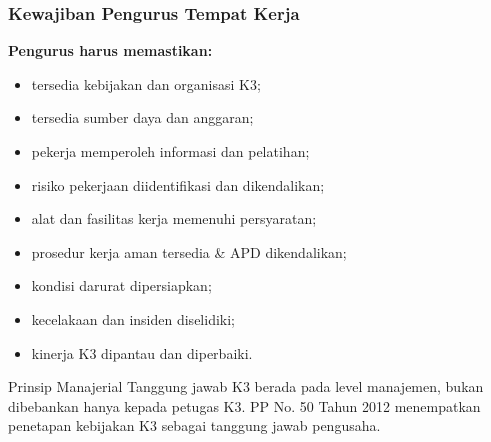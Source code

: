 \documentclass[../main.tex]{subfiles}
\begin{document}
\begin{frame}[mytitle=standard,t,mycolor=digiPH_cream!30]
	\frametitle{Kewajiban Pengurus Tempat Kerja}

	\textbf{Pengurus harus memastikan:}
	\begin{itemize}
		\item tersedia kebijakan dan organisasi K3;
		\item tersedia sumber daya dan anggaran;
		\item pekerja memperoleh informasi dan pelatihan;
		\item risiko pekerjaan diidentifikasi dan dikendalikan;
		\item alat dan fasilitas kerja memenuhi persyaratan;
		\item prosedur kerja aman tersedia \& APD dikendalikan;
		\item kondisi darurat dipersiapkan;
		\item kecelakaan dan insiden diselidiki;
		\item kinerja K3 dipantau dan diperbaiki.
	\end{itemize}

	\begin{block}{Prinsip Manajerial}
		Tanggung jawab K3 berada pada level manajemen, bukan dibebankan hanya kepada petugas K3. PP No. 50 Tahun 2012 menempatkan penetapan kebijakan K3 sebagai tanggung jawab pengusaha.
	\end{block}
\end{frame}
\end{document}
